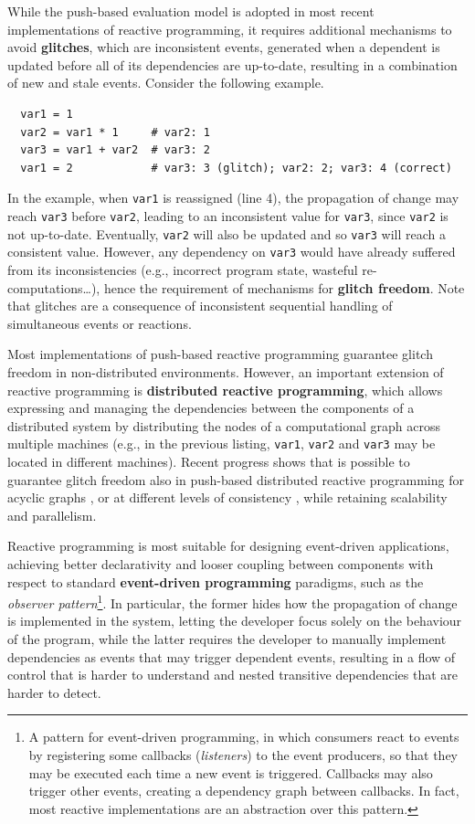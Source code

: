 While the push-based evaluation model is adopted in most recent implementations
of reactive programming, it requires additional mechanisms to avoid
\textbf{glitches}, which are inconsistent events, generated when a dependent is
updated before all of its dependencies are up-to-date, resulting in a
combination of new and stale events. Consider the following example.

\begin{lstlisting}
  var1 = 1
  var2 = var1 * 1     # var2: 1
  var3 = var1 + var2  # var3: 2
  var1 = 2            # var3: 3 (glitch); var2: 2; var3: 4 (correct)
\end{lstlisting}

In the example, when \texttt{var1} is reassigned (line 4), the propagation of
change may reach \texttt{var3} before \texttt{var2}, leading to an inconsistent
value for \texttt{var3}, since \texttt{var2} is not up-to-date. Eventually,
\texttt{var2} will also be updated and so \texttt{var3} will reach a consistent
value. However, any dependency on \texttt{var3} would have already suffered
from its inconsistencies (e.g., incorrect program state, wasteful
re-computations\dots), hence the requirement of mechanisms for \textbf{glitch
freedom}. Note that glitches are a consequence of inconsistent sequential
handling of simultaneous events or reactions.

Most implementations of push-based reactive programming guarantee glitch
freedom in non-distributed environments. However, an important extension of
reactive programming is \textbf{distributed reactive programming}, which allows
expressing and managing the dependencies between the components of a
distributed system by distributing the nodes of a computational graph across
multiple machines (e.g., in the previous listing, \texttt{var1}, \texttt{var2}
and \texttt{var3} may be located in different machines). Recent progress shows
that is possible to guarantee glitch freedom also in push-based distributed
reactive programming for acyclic graphs \cite{QPROP}, or at different levels of
consistency \cite{DREAM}, while retaining scalability and parallelism.

Reactive programming is most suitable for designing event-driven applications,
achieving better declarativity and looser coupling between components with
respect to standard \textbf{event-driven programming} paradigms, such as the
\textit{observer pattern}\footnote{A pattern for event-driven programming, in
which consumers react to events by registering some callbacks
(\textit{listeners}) to the event producers, so that they may be executed each
time a new event is triggered. Callbacks may also trigger other events,
creating a dependency graph between callbacks. In fact, most reactive
implementations are an abstraction over this pattern.}. In particular, the
former hides how the propagation of change is implemented in the system,
letting the developer focus solely on the behaviour of the program, while the
latter requires the developer to manually implement dependencies as events that
may trigger dependent events, resulting in a flow of control that is harder to
understand and nested transitive dependencies that are harder to detect.
